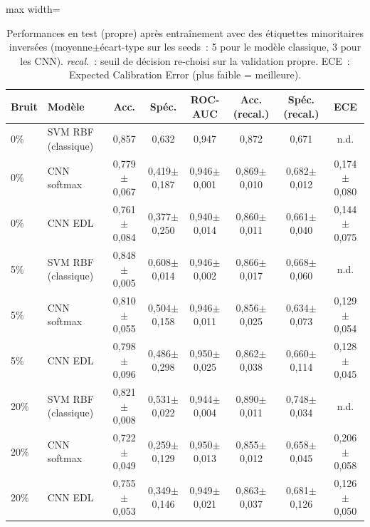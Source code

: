 \begin{table}[t]
\centering
\small
\caption{Performances en test (propre) après entraînement avec des étiquettes minoritaires inversées (moyenne$\pm$écart-type sur les seeds~: 5 pour le modèle classique, 3 pour les CNN). \emph{recal.}~: seuil de décision re-choisi sur la validation propre. ECE~: Expected Calibration Error (plus faible = meilleure).}
\label{tab:edl}
\begin{adjustbox}{max width=\textwidth}
\begin{tabular}{llcccccc}
\toprule
Bruit & Modèle & Acc. & Spéc. & ROC-AUC & Acc. (recal.) & Spéc. (recal.) & ECE \\
\midrule
0\% & SVM RBF (classique) & 0,857 & 0,632 & 0,947 & 0,872 & 0,671 & n.d. \\
0\% & CNN softmax & 0,779$\pm$0,067 & 0,419$\pm$0,187 & 0,946$\pm$0,001 & 0,869$\pm$0,010 & 0,682$\pm$0,012 & 0,174$\pm$0,080 \\
0\% & CNN EDL & 0,761$\pm$0,084 & 0,377$\pm$0,250 & 0,940$\pm$0,014 & 0,860$\pm$0,011 & 0,661$\pm$0,040 & 0,144$\pm$0,075 \\
5\% & SVM RBF (classique) & 0,848$\pm$0,005 & 0,608$\pm$0,014 & 0,946$\pm$0,002 & 0,866$\pm$0,017 & 0,668$\pm$0,060 & n.d. \\
5\% & CNN softmax & 0,810$\pm$0,055 & 0,504$\pm$0,158 & 0,946$\pm$0,011 & 0,856$\pm$0,025 & 0,634$\pm$0,073 & 0,129$\pm$0,054 \\
5\% & CNN EDL & 0,798$\pm$0,096 & 0,486$\pm$0,298 & 0,950$\pm$0,025 & 0,862$\pm$0,038 & 0,660$\pm$0,114 & 0,128$\pm$0,045 \\
20\% & SVM RBF (classique) & 0,821$\pm$0,008 & 0,531$\pm$0,022 & 0,944$\pm$0,004 & 0,890$\pm$0,011 & 0,748$\pm$0,034 & n.d. \\
20\% & CNN softmax & 0,722$\pm$0,049 & 0,259$\pm$0,129 & 0,950$\pm$0,013 & 0,855$\pm$0,012 & 0,658$\pm$0,045 & 0,206$\pm$0,058 \\
20\% & CNN EDL & 0,755$\pm$0,053 & 0,349$\pm$0,146 & 0,949$\pm$0,021 & 0,863$\pm$0,037 & 0,681$\pm$0,126 & 0,126$\pm$0,050 \\
\bottomrule
\end{tabular}
\end{adjustbox}
\end{table}
